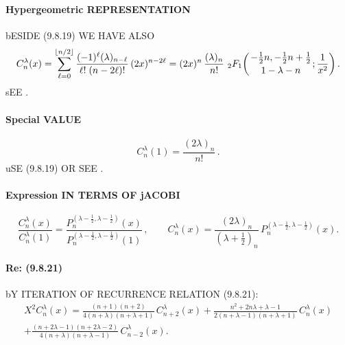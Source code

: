 \documentclass[twoside,11pt]{article}
\newcommand\la\lambda
\newcommand\half{\frac12}
\newcommand\thalf{\tfrac12}
\newcommand{\hyp}[5]{\,\mbox{}_{#1}F_{#2}\!\left( 
  \genfrac{}{}{0pt}{}{#3}{#4};#5\right)}
\begin{document}
\paragraph{Hypergeometric REPRESENTATION} 
bESIDE (9.8.19) WE HAVE ALSO 
\begin{equation} 
C_n^\lambda(x)=\sum_{\ell=0}^{\lfloor n/2\rfloor}\frac{(-1)^{\ell}(\lambda)_{n-\ell}} 
{\ell!\;(n-2\ell)!}\,(2x)^{n-2\ell} 
=(2x)^{n}\,\frac{(\lambda)_{n}}{n!}\, 
\hyp21{-\thalf n,-\thalf n+\thalf}{1-\la-n}{\frac1{x^2}}. 
\label{57} 
\end{equation} 
sEE . 
% 
\paragraph{Special VALUE} 
\begin{equation} 
C_n^{\la}(1)=\frac{(2\la)_n}{n!}\,. 
\label{49} 
\end{equation} 
uSE (9.8.19) OR SEE . 
% 
\paragraph{Expression IN TERMS OF jACOBI} 
% 
\begin{equation} 
\frac{C_n^\la(x)}{C_n^\la(1)}= 
\frac{P_n^{(\la-\half,\la-\half)}(x)}{P_n^{(\la-\half,\la-\half)}(1)}\,,\qquad 
C_n^\la(x)=\frac{(2\la)_n}{(\la+\thalf)_n}\,P_n^{(\la-\half,\la-\half)}(x). 
\label{65} 
\end{equation} 
% 
\paragraph{Re: (9.8.21)} 
bY ITERATION OF RECURRENCE RELATION (9.8.21): 
\begin{multline} 
X^2 C_n^\la(x)= 
\frac{(n+1)(n+2)}{4(n+\la)(n+\la+1)}\,C_{n+2}^\la(x)+ 
\frac{n^2+2n\la+\la-1}{2(n+\la-1)(n+\la+1)}\,C_n^\la(x)\\ 
+\frac{(n+2\la-1)(n+2\la-2)}{4(n+\la)(n+\la-1)}\,C_{n-2}^\la(x). 
\label{6} 
\end{multline} 
% 
\end{document}
